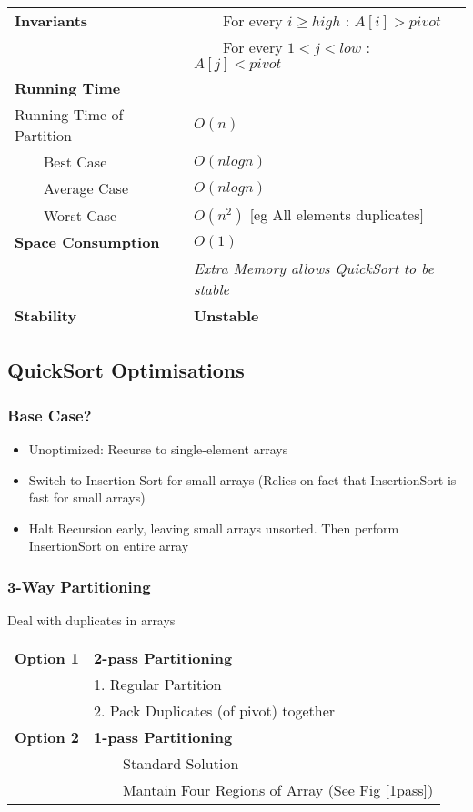 \documentclass{article}
\newcommand{\tabitem}{~~\llap{\textbullet}~~}
\begin{document}
    \begin{tabular}{ll}
        \toprule
        \textbf{Invariants} & \tabitem For every $i \geq high$ : $A[i] > pivot$\\
        & \tabitem For every $1 < j < low$ : $A[j] < pivot$\\
        \textbf{Running Time} & \\
        Running Time of Partition & $O(n)$\\
        \tabitem Best Case & $O(nlogn)$\\
        \tabitem Average Case & $O(nlogn)$\\
        \tabitem Worst Case & $O(n^{2})$ [eg All elements duplicates]\\
        \midrule
        \textbf{Space Consumption} & $O(1)$\\
        & \emph{Extra Memory allows QuickSort to be stable}\\
        \midrule
        \textbf{Stability} & \textbf{Unstable}\\
        \bottomrule
    \end{tabular}


    

    \subsection{QuickSort Optimisations}

    \subsubsection{Base Case?}
    \begin{itemize}
        \item Unoptimized: Recurse to single-element arrays
        \item Switch to Insertion Sort for small arrays (Relies on fact that InsertionSort is fast for small arrays)
        \item Halt Recursion early, leaving small arrays unsorted. Then perform InsertionSort on entire array
    \end{itemize}
    
    \pagebreak

    \subsubsection{3-Way Partitioning}

    Deal with duplicates in arrays

    \begin{tabular}{ll}
        \textbf{Option 1} & \textbf{2-pass Partitioning}\\
        & 1. Regular Partition\\
        & 2. Pack Duplicates (of pivot) together\\
        \textbf{Option 2} & \textbf{1-pass Partitioning}\\
        & \tabitem Standard Solution\\
        & \tabitem Mantain Four Regions of Array (See Fig \ref{1pass})\\
    \end{tabular}
\end{document}
